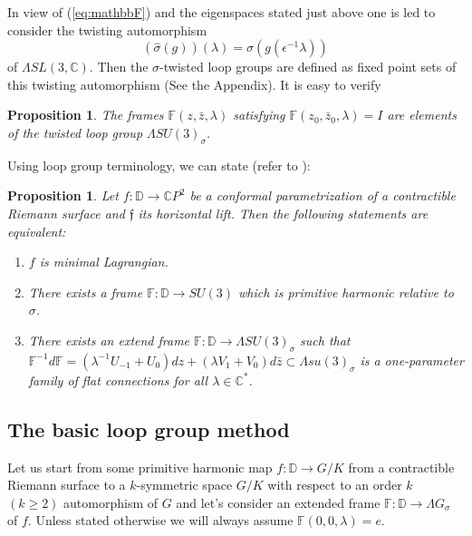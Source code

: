 \documentclass[a4paper,11pt]{amsart}
\newtheorem{proposition}[theorem]{Proposition}
\theoremstyle{definition}
\numberwithin{equation}{section}
\newcommand{\C}{\mathbb{C}}
\newcommand{\D}{\mathbb{D}}
\newcommand{\F}{\mathbb{F}}
\newcommand{\f}{\mathfrak{f}}
\begin{document}
In view of (\ref{eq:mathbbF}) and the eigenspaces stated just above one is led to consider the twisting automorphism
\begin{equation}\label{sigma:twist}
(\hat{\sigma} (g))(\lambda) = \sigma ( g( \epsilon^{-1} \lambda))
\end{equation}
of $\Lambda SL(3,\C)$.
Then the $\sigma$-twisted loop groups are defined as fixed point sets of this twisting automorphism (See the Appendix). It is easy to verify

\begin{proposition}
The frames $\mathbb{F} (z, \bar{z}, \lambda)$ satisfying 
$\mathbb{F} (z_0, \bar{z}_0, \lambda) = I$ are elements of the twisted loop group
$\Lambda SU(3)_\sigma$. 
\end{proposition}

Using loop group terminology, we can state (refer to \cite{MM}):



\begin{proposition} \label{char-mLi}
Let $f: \D \rightarrow \mathbb{C}P^2$ be a conformal parametrization 
of a contractible Riemann surface and $\f$ its horizontal lift.
Then the following statements are equivalent:
\begin{enumerate}
\item $f$ is minimal Lagrangian.
\item There exists a frame $\mathbb{F}: \D \rightarrow SU(3)$ which is primitive harmonic relative to $\sigma$. 
\item  There exists an extend frame $\F: \D\rightarrow \Lambda SU(3)_{\sigma}$ such that $\mathbb{F}^{-1}d\mathbb{F} =(\lambda^{-1} U_{-1}+U_0)dz+(\lambda V_1+V_0)d\bar{z} 
\subset \Lambda su(3)_{\sigma}$ is a one-parameter family of flat connections for all $\lambda \in \C^*$.
\end{enumerate}
\end{proposition}

\subsection{The basic loop group method}
\label{subsection:loop method}


Let us start from some primitive harmonic map $f: \D \rightarrow G/K$ from a contractible Riemann surface to a $k$-symmetric space $G/K$ with respect to an order $k$ $(k\geq 2)$ automorphism of $G$ and let's consider an  extended frame  $\F:  \D \rightarrow \Lambda G_{\sigma}$ of $f$. 
Unless stated otherwise we will always assume $\F(0,0,\lambda) = e$. 
\end{document}
